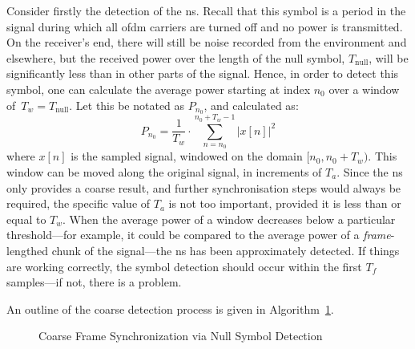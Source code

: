 \documentclass[class=report,11pt,crop=false]{standalone}
\begin{document}
Consider firstly the detection of the \gls{ns}. Recall that this symbol is a period in the signal during which all \gls{ofdm} carriers are turned off and no power is transmitted. On the receiver's end, there will still be noise recorded from the environment and elsewhere, but the received power over the length of the null symbol, \(T_\textrm{null}\), will be significantly less than in other parts of the signal. Hence, in order to detect this symbol, one can calculate the average power starting at index \(n_0\) over a window of~\(T_w = T_\textrm{null}\). Let this be notated as \(P_{n_0}\), and calculated as:
\begin{equation}
  P_{n_0} = \frac{1}{T_w} \cdot \sum^{n_0 + T_w - 1}_{n=n_0} \left| x[n] \right|^2
\end{equation}
where \(x[n]\) is the sampled signal, windowed on the domain \([n_0, n_0 + T_w)\). This window can be moved along the original signal, in increments of \(T_a\). Since the \gls{ns} only provides a coarse result, and further synchronisation steps would always be required, the specific value of \(T_a\) is not too important, provided it is less than or equal to \(T_w\). When the average power of a window decreases below a particular threshold---for example, it could be compared to the average power of a \emph{frame}-lengthed chunk of the signal---the \gls{ns} has been approximately detected. If things are working correctly, the symbol detection should occur within the first \(T_f\) samples---if not, there is a problem.

An outline of the coarse detection process is given in Algorithm~\ref{alg:null_symbol_detect}.

\begin{figure}[ht]
  \vspace{0.5cm}
  \centering
  \captionsetup{type=figure}
  \begin{minipage}{.75\linewidth}
    \begin{algorithm}[H]
      \caption{Coarse Frame Synchronization via Null Symbol Detection\label{alg:null_symbol_detect}}

      \DontPrintSemicolon
      \SetAlgoLined


      \BlankLine
      \vspace{0.5cm}
    \end{algorithm}
  \end{minipage}
\end{figure}
\end{document}
